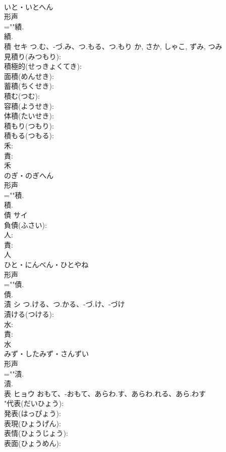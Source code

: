 \documentclass[8pt]{extreport}
\begin{document}
\begin{CJK}{UTF8}{min}
\\	いと・いとへん	
\\	形声 
\\	=""績.
\\	績.
\\	積	セキ	つ.む、-づ.み、つ.もる、つ.もり	か, さか, しゃこ, ずみ, つみ	
\\	見積り(みつもり): 
\\	積極的(せっきょくてき): 
\\	面積(めんせき): 
\\	蓄積(ちくせき): 
\\	積む(つむ): 
\\	容積(ようせき): 
\\	体積(たいせき): 
\\	積もり(つもり): 
\\	積もる(つもる): 
\\	禾: 
\\	責: 
\\	禾	
\\	のぎ・のぎへん	
\\	形声 
\\	=""積.
\\	積.
\\	債	サイ			
\\	負債(ふさい): 
\\	人: 
\\	責: 
\\	人	
\\	ひと・にんべん・ひとやね	
\\	形声 
\\	=""債.
\\	債.
\\	漬	シ	つ.ける、つ.かる、-づ.け、-づけ		
\\	漬ける(つける): 
\\	水: 
\\	責: 
\\	水	
\\	みず・したみず・さんずい	
\\	形声 
\\	=""漬.
\\	漬.
\\	表	ヒョウ	おもて、-おもて、あらわ.す、あらわ.れる、あら.わす		
\\	"代表(だいひょう): 
\\	発表(はっぴょう): 
\\	表現(ひょうげん): 
\\	表情(ひょうじょう): 
\\	表面(ひょうめん): 

\end{CJK}
\end{document}
